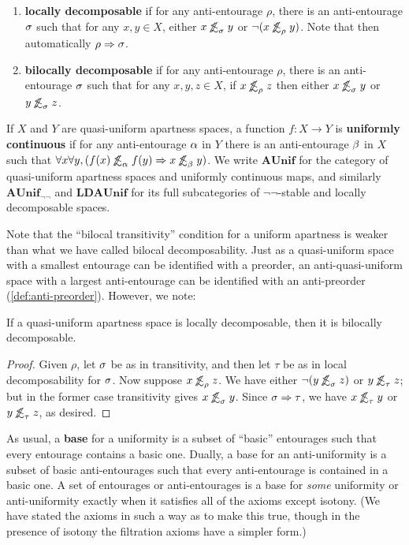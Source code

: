 \documentclass{article}
\def\oapt{\mathrel{\!\not\,\not\lesssim}}
\let\implies\Rightarrow
\def\nn{\ensuremath{\neg\neg}}
\def\AUnif{\mathbf{AUnif}}
\def\AUnifnn{\mathbf{AUnif}_{\nn}}
\def\LDAUnif{\mathbf{LDAUnif}}
\begin{document}
\begin{defn}
\begin{enumerate}[resume]
  \item \textbf{locally decomposable} if for any anti-entourage $\rho$, there is an anti-entourage $\sigma$ such that for any $x,y\in X$, either $x\oapt_\si y$ or $\neg(x\oapt_\rho y)$.
    Note that then automatically $\rho\implies\si$.
  \item \textbf{bilocally decomposable} if for any anti-entourage $\rho$, there is an anti-entourage $\sigma$ such that for any $x,y,z\in X$, if $x\oapt_\rho z$ then either $x\oapt_\si y$ or $y\oapt_\si z$.
  \end{enumerate}
  If $X$ and $Y$ are quasi-uniform apartness spaces, a function $f:X\to Y$ is \textbf{uniformly continuous} if for any anti-entourage $\alpha$ in $Y$ there is an anti-entourage $\beta$ in $X$ such that $\forall x\forall y, (f(x)\oapt_\al f(y) \implies x\oapt_\be y)$.
  We write $\AUnif$ for the category of quasi-uniform apartness spaces and uniformly continuous maps, and similarly $\AUnifnn$ and $\LDAUnif$ for its full subcategories of \nn-stable and locally decomposable spaces.
\end{defn}

Note that the ``bilocal transitivity'' condition for a uniform apartness is weaker than what we have called bilocal decomposability.
Just as a quasi-uniform space with a smallest entourage can be identified with a preorder, an anti-quasi-uniform space with a largest anti-entourage can be identified with an anti-preorder (\cref{def:anti-preorder}).
However, we note:

\begin{lem}
  If a quasi-uniform apartness space is locally decomposable, then it is bilocally decomposable.
\end{lem}
\begin{proof}
  Given $\rho$, let $\sigma$ be as in transitivity, and then let $\tau$ be as in local decomposability for $\sigma$.
  Now suppose $x\oapt_\rho z$.
  We have either $\neg(y\oapt_\si z)$ or $y\oapt_\tau z$; but in the former case transitivity gives $x\oapt_\si y$.
  Since $\si\implies\tau$, we have $x\oapt_\tau y$ or $y\oapt_\tau z$, as desired.
\end{proof}

As usual, a \textbf{base} for a uniformity is a subset of ``basic'' entourages such that every entourage contains a basic one.
Dually, a base for an anti-uniformity is a subset of basic anti-entourages such that every anti-entourage is contained in a basic one.
A set of entourages or anti-entourages is a base for \emph{some} uniformity or anti-uniformity exactly when it satisfies all of the axioms except isotony.
(We have stated the axioms in such a way as to make this true, though in the presence of isotony the filtration axioms have a simpler form.)
\end{document}
